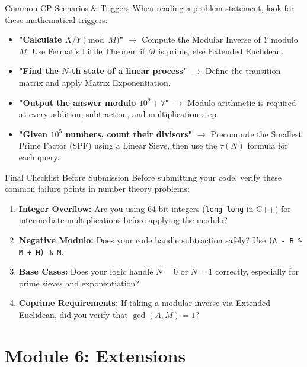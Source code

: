 \documentclass[aspectratio=169]{beamer}
\begin{document}
\begin{frame}{Common CP Scenarios \& Triggers}
    When reading a problem statement, look for these mathematical triggers:
    
    \vspace{0.3cm}
    \begin{itemize}
        \item \textbf{"Calculate $X / Y \pmod M$"} $\rightarrow$ Compute the Modular Inverse of $Y$ modulo $M$. Use Fermat's Little Theorem if $M$ is prime, else Extended Euclidean.
        \item \textbf{"Find the $N$-th state of a linear process"} $\rightarrow$ Define the transition matrix and apply Matrix Exponentiation.
        \item \textbf{"Output the answer modulo $10^9 + 7$"} $\rightarrow$ Modulo arithmetic is required at every addition, subtraction, and multiplication step.
        \item \textbf{"Given $10^5$ numbers, count their divisors"} $\rightarrow$ Precompute the Smallest Prime Factor (SPF) using a Linear Sieve, then use the $\tau(N)$ formula for each query.
    \end{itemize}
\end{frame}

\begin{frame}{Final Checklist Before Submission}
    Before submitting your code, verify these common failure points in number theory problems:
    
    \vspace{0.3cm}
    \begin{enumerate}
        \item \textbf{Integer Overflow:} Are you using 64-bit integers (\texttt{long long} in C++) for intermediate multiplications before applying the modulo?
        \item \textbf{Negative Modulo:} Does your code handle subtraction safely? Use \texttt{(A - B \% M + M) \% M}.
        \item \textbf{Base Cases:} Does your logic handle $N=0$ or $N=1$ correctly, especially for prime sieves and exponentiation?
        \item \textbf{Coprime Requirements:} If taking a modular inverse via Extended Euclidean, did you verify that $\gcd(A, M) = 1$?
    \end{enumerate}
\end{frame}

\section{Module 6: Extensions}
\end{document}
